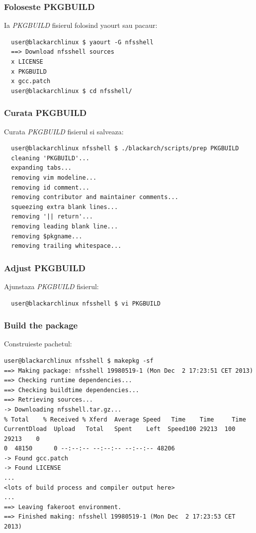 \documentclass[a4paper, oneside, 11pt]{book}
\begin{document}
\subsubsection{Foloseste PKGBUILD}
Ia \textit{PKGBUILD} fisierul folosind yaourt sau pacaur:
\begin{lstlisting}
  user@blackarchlinux $ yaourt -G nfsshell
  ==> Download nfsshell sources
  x LICENSE
  x PKGBUILD
  x gcc.patch
  user@blackarchlinux $ cd nfsshell/
\end{lstlisting}

\subsubsection{Curata PKGBUILD}
Curata \textit{PKGBUILD} fisierul si salveaza:
\begin{lstlisting}
  user@blackarchlinux nfsshell $ ./blackarch/scripts/prep PKGBUILD
  cleaning 'PKGBUILD'...
  expanding tabs...
  removing vim modeline...
  removing id comment...
  removing contributor and maintainer comments...
  squeezing extra blank lines...
  removing '|| return'...
  removing leading blank line...
  removing $pkgname...
  removing trailing whitespace...
\end{lstlisting}

\subsubsection{Adjust PKGBUILD}
Ajunstaza \textit{PKGBUILD} fisierul:
\begin{lstlisting}
  user@blackarchlinux nfsshell $ vi PKGBUILD
\end{lstlisting}

\subsubsection{Build the package}
Construieste pachetul:
\begin{lstlisting}user@blackarchlinux nfsshell $ makepkg -sf
==> Making package: nfsshell 19980519-1 (Mon Dec  2 17:23:51 CET 2013)
==> Checking runtime dependencies...
==> Checking buildtime dependencies...
==> Retrieving sources...
-> Downloading nfsshell.tar.gz...
% Total    % Received % Xferd  Average Speed   Time    Time     Time
CurrentDload  Upload   Total   Spent    Left  Speed100 29213  100 29213    0
0  48150      0 --:--:-- --:--:-- --:--:-- 48206
-> Found gcc.patch
-> Found LICENSE
...
<lots of build process and compiler output here>
...
==> Leaving fakeroot environment.
==> Finished making: nfsshell 19980519-1 (Mon Dec  2 17:23:53 CET 2013)
\end{lstlisting}
\end{document}
